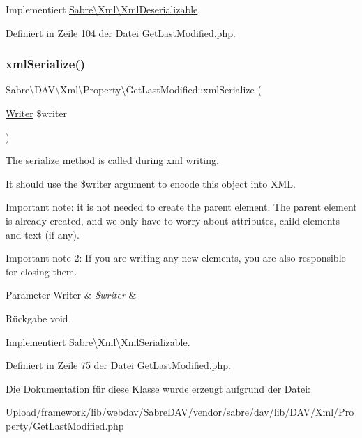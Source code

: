 Implementiert \mbox{\hyperlink{interface_sabre_1_1_xml_1_1_xml_deserializable_a19e0eca545b9a0d93f7d6b69085ade30}{Sabre\textbackslash{}\+Xml\textbackslash{}\+Xml\+Deserializable}}.



Definiert in Zeile 104 der Datei Get\+Last\+Modified.\+php.

\mbox{\label{class_sabre_1_1_d_a_v_1_1_xml_1_1_property_1_1_get_last_modified_a13dde5cac8cec9eca81c3a14f78fcea3}} 
\subsubsection{\texorpdfstring{xml\+Serialize()}{xmlSerialize()}}
{\footnotesize\ttfamily Sabre\textbackslash{}\+D\+A\+V\textbackslash{}\+Xml\textbackslash{}\+Property\textbackslash{}\+Get\+Last\+Modified\+::xml\+Serialize (\begin{DoxyParamCaption}\item[{\mbox{\hyperlink{class_sabre_1_1_xml_1_1_writer}{Writer}}}]{\$writer }\end{DoxyParamCaption})}

The serialize method is called during xml writing.

It should use the \$writer argument to encode this object into X\+ML.

Important note\+: it is not needed to create the parent element. The parent element is already created, and we only have to worry about attributes, child elements and text (if any).

Important note 2\+: If you are writing any new elements, you are also responsible for closing them.


\begin{DoxyParams}[1]{Parameter}
Writer & {\em \$writer} & \\
\hline
\end{DoxyParams}
\begin{DoxyReturn}{Rückgabe}
void 
\end{DoxyReturn}


Implementiert \mbox{\hyperlink{interface_sabre_1_1_xml_1_1_xml_serializable_aa78f3ee43aa699be8347181653a53d8c}{Sabre\textbackslash{}\+Xml\textbackslash{}\+Xml\+Serializable}}.



Definiert in Zeile 75 der Datei Get\+Last\+Modified.\+php.



Die Dokumentation für diese Klasse wurde erzeugt aufgrund der Datei\+:\begin{DoxyCompactItemize}
\item 
Upload/framework/lib/webdav/\+Sabre\+D\+A\+V/vendor/sabre/dav/lib/\+D\+A\+V/\+Xml/\+Property/Get\+Last\+Modified.\+php\end{DoxyCompactItemize}
